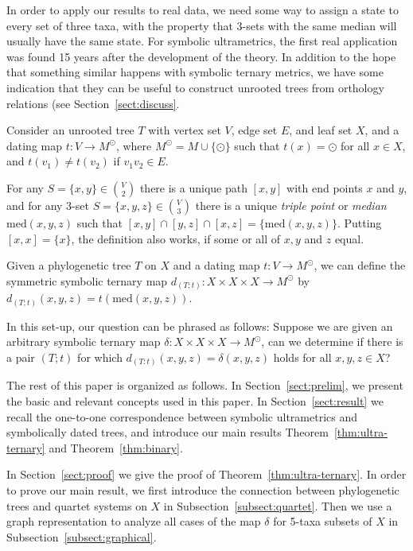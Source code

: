 \documentclass{article}
\begin{document}
In order to apply our results to real data, we need some way to assign a state to
every set of three taxa, with the property that 3-sets with the same median will
usually have the same state. For symbolic ultrametrics, the first real application
was found 15 years after the development of the theory. In addition to the hope that
something similar happens with symbolic ternary metrics, we have some indication that
they can be useful to construct unrooted trees from orthology relations (see Section~\ref{sect:discuss}. 

Consider an unrooted tree $T$ with vertex set $V$, edge set $E$, and leaf 
set 
$X$, and a dating map $t:V\to M^\odot$, where $M^\odot=M\cup \{\odot\}$ such that
$t(x) = \odot$ for all $x\in X$, and $t(v_1)\neq t(v_2)$ if $v_1v_2\in E$.

For any $S=\{x,y\}\in {V \choose 2}$ there is a unique path $[x,y]$ with end 
points $x$ and $y$, and for any 3-set 
$S=\{x,y,z\}\in {V\choose 3}$ there is a unique \textit{triple point} or 
\textit{median} $\text{med}(x,y,z)$ such that 
$[x,y]\cap [y,z]\cap [x,z]=\{\text{med}(x,y,z)\}$. Putting $[x,x]=\{x\}$, 
the 
definition also works, if some or all of $x,y$
and $z$ equal.


Given a phylogenetic tree $T$ on $X$ and a dating map $t: V\to M^\odot $, we can 
define the symmetric symbolic ternary map
$d_{(T;t)}: X\times X\times X\to  M^\odot$
by
$d_{(T;t)}(x,y,z)=t(\text{med}(x,y,z))$. 



In this set-up, our question can be phrased as follows: Suppose we are given an arbitrary
symbolic ternary map $\delta: X\times X\times X\to M^\odot$,
can we determine if there is a pair $(T;t)$ for which 
$d_{(T:t)}(x,y,z)=\delta(x,y,z)$ holds for all $x,y,z\in X$?




The rest of this paper is organized as follows.
In Section~\ref{sect:prelim}, we present the basic and relevant concepts used 
in this paper.
In Section~\ref{sect:result} we recall the one-to-one correspondence between 
symbolic ultrametrics and
symbolically dated trees, and introduce our main results 
Theorem~\ref{thm:ultra-ternary} and Theorem~\ref{thm:binary}.

In Section~\ref{sect:proof} we give the proof of Theorem~\ref{thm:ultra-ternary}.
In order to prove our main result, we first introduce the connection between 
phylogenetic trees and quartet systems on $X$ 
in Subsection~\ref{subsect:quartet}. Then we use a graph representation 
to analyze all cases of the map $\delta$ for 5-taxa subsets of $X$ in 
Subsection~\ref{subsect:graphical}.
\end{document}
